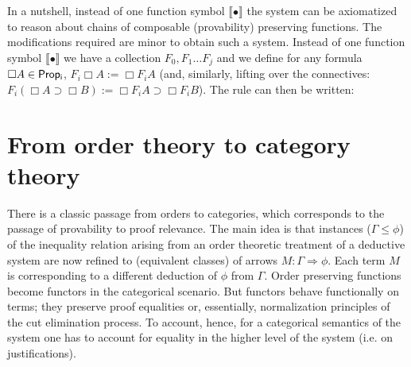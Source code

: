 In a nutshell, instead 
of one function symbol $\llbracket\bullet \rrbracket$ 
the system can 
be axiomatized to reason about chains of 
composable (provability) preserving functions. 
The modifications required are minor to obtain such a system.
Instead of one function symbol $\llbracket\bullet \rrbracket$ 
we have a collection $F_0, F_1\ldots F_j$ and we 
define for any formula $\Box A\in {\sf Prop_i}$, 
$F_i\Box A:= \Box F_i A$ (and, similarly, lifting over the connectives: 
$F_i(\Box A\supset \Box B):= \Box F_i A\supset\Box F_i B$).
The rule can then be written:





\section{From order theory to category theory}

There is a classic passage from orders to categories, 
which corresponds to the passage of provability to 
proof relevance. The main idea is that  instances ($\Gamma\le\phi$)
of the inequality relation arising from an order theoretic treatment
of a deductive system are now refined to (equivalent classes) 
of arrows $M:\Gamma\Longrightarrow \phi$. Each
term $M$ is corresponding to a different deduction  of $\phi$ 
from $\Gamma$.
Order preserving functions become 
functors in the categorical scenario. But functors behave functionally
on terms; they preserve proof equalities  or, essentially, normalization principles of the cut elimination process.
To account, hence, for 
a categorical semantics of the system one has to account for equality
in the higher level of the system (i.e. on justifications).

